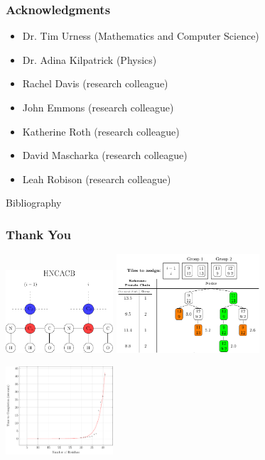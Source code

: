 \documentclass{beamer}
\begin{document}
\begin{frame}
	\frametitle{Acknowledgments}
	\begin{itemize}
		\item Dr. Tim Urness (Mathematics and Computer Science)
		\item Dr. Adina Kilpatrick (Physics)
		\item Rachel Davis (research colleague)
		\item John Emmons (research colleague)
		\item  Katherine Roth (research colleague)
		\item  David Mascharka (research colleague)
		\item  Leah Robison (research colleague)
	\end{itemize}
\end{frame}

\begin{frame}{Bibliography}
\nocite{*}


\end{frame}

\begin{frame}
	\frametitle{Thank You} 
	\begin{center}
	\includegraphics[width=0.3\textwidth]{diagram}\hspace{2em}
	\includegraphics[width=0.4\textwidth]{tilePlacement/step10}
	\end{center}
	\begin{center}
	\includegraphics[width=0.3\textwidth]{plot}\hspace{2em}
	\resizebox{!}{.3\paperheight}{}
\end{center}
\end{frame}
\end{document}
